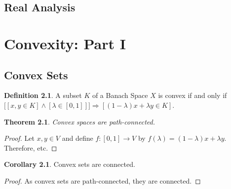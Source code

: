\documentclass[oneside]{book}
\newtheorem{theorem}{Theorem}[section]
\theoremstyle{definition}
\newtheorem{definition}{Definition}[section]
\newtheorem{corollary}{Corollary}[section]
\begin{document}
\section{Real Analysis}











































\chapter{Convexity: Part I}

\section{Convex Sets}

\begin{definition}
A subset $K$ of a Banach Space $X$ is convex if and only if $\big[[x,y\in K]\land  [\lambda \in [0,1]]\big]\Rightarrow[(1-\lambda)x+\lambda y\in K]$.
\end{definition}

\begin{theorem}
Convex spaces are path-connected.
\end{theorem}
\begin{proof}
Let $x,y\in V$ and define $f:[0,1]\rightarrow V$ by $f(\lambda) = (1-\lambda)x+\lambda y$. Therefore, etc.
\end{proof}

\begin{corollary}
Convex sets are connected.
\end{corollary}
\begin{proof}
As convex sets are path-connected, they are connected.
\end{proof}
\end{document}
